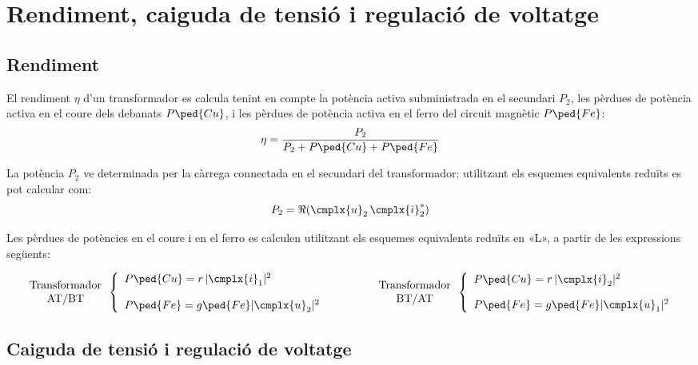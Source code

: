 \section{Rendiment, caiguda de tensió i regulació de voltatge}

\subsection{Rendiment}

El rendiment $\eta$ d'un transformador es calcula tenint en compte la potència activa subministrada en el secundari $P_2$,  les pèrdues de potència activa en el coure dels debanats $P\ped{Cu}$, i les pèrdues de potència activa en el ferro del circuit magnètic $P\ped{Fe}$:
\begin{equation}
    \eta = \frac{P_2}{P_2 + P\ped{Cu} + P\ped{Fe}}
\end{equation}

La potència $P_2$ ve determinada per la càrrega connectada en el secundari del transformador;  utilitzant els esquemes equivalents reduïts es pot calcular com:
\begin{equation}
    P_2 = \Re(\cmplx{u}_2 \,\cmplx{i}_2^*)
\end{equation}

Les pèrdues de potències  en el coure i en el ferro es calculen utilitzant els esquemes equivalents reduïts en «L», a partir de les expressions següents:

\begin{equation}
\begin{array}{c}\text{Transformador}\\
\text{AT/BT}
\end{array} \left\{
\begin{array}{l}
   P\ped{Cu} = r \,|\cmplx{i}_1|^2 \\[2.7ex]
   P\ped{Fe} = g\ped{Fe} |\cmplx{u}_2|^2
\end{array}
\right. \qquad\qquad
\begin{array}{c}\text{Transformador}\\
\text{BT/AT}
\end{array} \left\{
\begin{array}{l}
   P\ped{Cu} = r \,|\cmplx{i}_2|^2 \\[2.5ex]
   P\ped{Fe} = g\ped{Fe} |\cmplx{u}_1|^2
\end{array}
\right.
\end{equation}

\subsection{Caiguda de tensió i regulació de voltatge}

